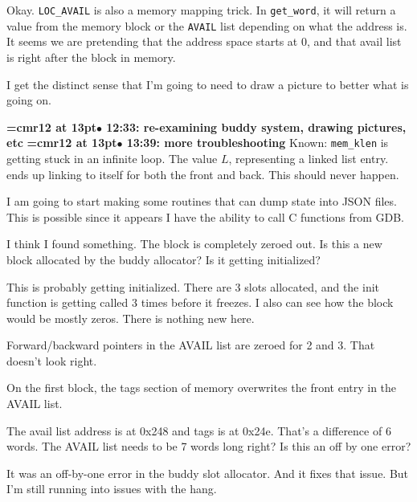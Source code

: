Okay. {\tt LOC\_AVAIL} is also a memory mapping trick. In {\tt get\_word}, it will return a value from the memory block or the {\tt AVAIL} list depending on what the address is. It seems we are pretending that the address space starts at 0, and that avail list is right after the block in memory.
\par

I get the distinct sense that I'm going to need to draw a picture to better what is going on.
\par

{\smallskip\noindent\bf\font\titlefont=cmr12 at 13pt\titlefont $\bullet$ 12:33: re-examining buddy system, drawing pictures, etc}\smallskip
{\smallskip\noindent\bf\font\titlefont=cmr12 at 13pt\titlefont $\bullet$ 13:39: more troubleshooting}\smallskip
Known: {\tt mem\_klen} is getting stuck in an infinite loop. The value $L$, representing a linked list entry. ends up linking to itself for both the front and back. This should never happen.
\par

I am going to start making some routines that can dump state into JSON files. This is possible since it appears I have the ability to call C functions from GDB.
\par

I think I found something. The block is completely zeroed out. Is this a new block allocated by the buddy allocator? Is it getting initialized?
\par

This is probably getting initialized. There are 3 slots allocated, and the init function is getting called 3 times before it freezes. I also can see how the block would be mostly zeros. There is nothing new here.
\par

Forward/backward pointers in the AVAIL list are zeroed for 2 and 3. That doesn't look right.
\par

On the first block, the tags section of memory overwrites the front entry in the AVAIL list.
\par

The avail list address is at {0x248} and tags is at {0x24e}. That's a difference of 6 words. The AVAIL list needs to be 7 words long right? Is this an off by one error?
\par

It was an off-by-one error in the buddy slot allocator. And it fixes that issue. But I'm still running into issues with the hang.
\par

